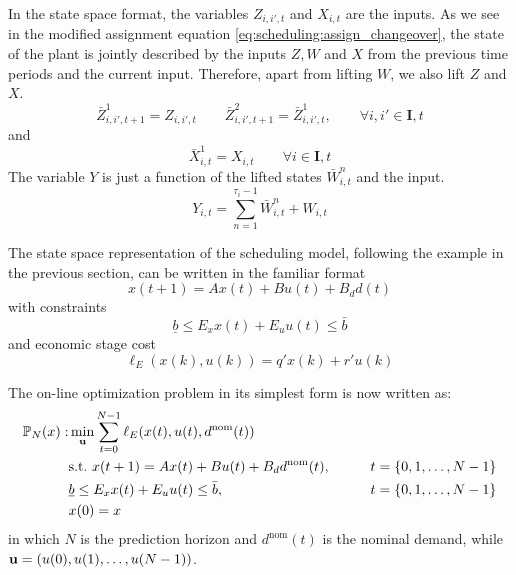 In the state space format, the variables
$Z_{i,i',t}$ and $X_{i,t}$ are the inputs. 
As we see in the
modified assignment equation \eqref{eq:scheduling:assign_changeover},
the state of the plant is jointly described by the inputs $Z,W$ and
$X$ from the previous time periods and the current input. Therefore,
apart from lifting $W$, we also lift $Z$ and $X$.
\[ \bar{Z}_{i,i',t+1}^{1} = Z_{i,i',t} \qquad \bar{Z}_{i,i',t+1}^{2} =
\bar{Z}_{i,i',t}^{1},\qquad \forall i,i' \in \mathbf{I}, t\]
and 
\[\bar{X}_{i,t}^{1} = X_{i,t} \qquad \forall  i \in \mathbf{I},t\]
The variable $Y$ is just a function of the lifted states
$\bar{W}_{i,t}^{n}$ and the input.
\[ Y_{i,t} = \sum_{n=1}^{\tau_i-1} \bar{W}_{i,t}^{n} + W_{i,t}\]

The state space representation of the scheduling model, following the
example in the previous section, can be written in the familiar format 
\[ x(t+1) = Ax(t) + Bu(t) + B_d d(t)
\]
with constraints
\[\underline{b} \leq  E_x x(t) + E_u u(t) \leq \bar{b}
\]
and economic stage cost
\[ \ell_E(x(k),u(k)) = q'x(k) + r'u(k)
\]

The on-line optimization problem in its simplest form is now written
as:
\begin{alignat}{2}
\label{eq:scheduling:NT}
\mathbb{P}_N(x):&
\min_{\mathbf{u}}{\sum_{t=0}^{N-1}\ell_E(x(t),u(t),d^{\text{nom}}(t))}&
\nonumber \\ 
&\text{s.t.~} x(t+1) = Ax(t) + Bu(t)+B_dd^{\text{nom}}(t), &\qquad t = \left\lbrace 0,1,\ldots,N-1 \right\rbrace\nonumber\\
&\underline{b} \leq E_xx(t) + E_u u(t) \leq \bar{b}, &\qquad t = \left\lbrace 0,1,\ldots,N-1 \right\rbrace \\
& x(0) = x &\nonumber
\end{alignat}
in which $N$ is the prediction horizon and $d^{\text{nom}}(t)$ is the
nominal demand, while $\mathbf{u} = (u(0),u(1),\ldots,u(N-1))$.

